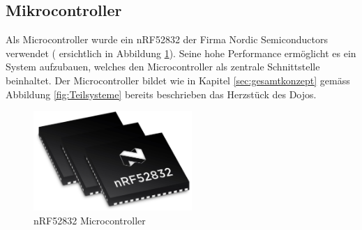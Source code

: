 \subsection{Mikrocontroller} \label{sec:microcontrollerHardware}

Als Microcontroller wurde ein nRF52832 der Firma Nordic Semiconductors verwendet ( ersichtlich in Abbildung \ref{fig:nRF52832}). Seine hohe Performance ermöglicht es ein System aufzubauen, welches den Microcontroller als zentrale Schnittstelle beinhaltet. Der Microcontroller bildet wie in Kapitel \ref{sec:gesamtkonzept} gemäss Abbildung \ref{fig:Teilsysteme} bereits beschrieben das Herzstück des Dojos. 

\begin{figure}[H]
	\begin{center}
		\includegraphics[width=60mm]{data/nRF52832.png}
		\caption[nRF52832 Microcontroller]{nRF52832 Microcontroller \cite{nRF52832}} %
		\label{fig:nRF52832}
	\end{center}
\end{figure}

